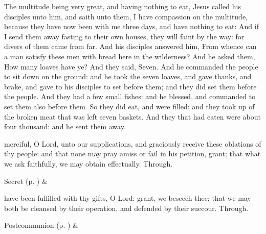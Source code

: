 \clearpage
{}
 The multitude being very great, and having nothing to eat, Jesus called his disciples unto him, and saith unto them, I have compassion on the multitude, because they have now been with me three days, and have nothing to eat: And if I send them away fasting to their own houses, they will faint by the way: for divers of them came from far. And his disciples answered him, From whence can a man satisfy these men with bread here in the wilderness? And he asked them, How many loaves have ye? And they said, Seven. And he commanded the people to sit down on the ground: and he took the seven loaves, and gave thanks, and brake, and gave to his disciples to set before them; and they did set them before the people. And they had a few small fishes: and he blessed, and commanded to set them also before them. So they did eat, and were filled: and they took up of the broken meat that was left seven baskets. And they that had eaten were about four thousand: and he sent them away.


\secret
{} merciful, O Lord, unto our supplications, and graciously receive these oblations of thy people: and that none may pray amiss or fail in his petition, grant; that what we ask faithfully, we may obtain effectually. Through.
\begin{rubric}
     Secret  (p. \pageref{SPSaints}) \&  
\end{rubric}


\postcommunion
{} have been fulfilled with thy gifts, O Lord: grant, we beseech thee; that we may both be cleansed by their operation, and defended by their succour. Through.
\begin{rubric}
     Postcommunion  (p. \pageref{SPSaints}) \&  
\end{rubric}


\clearpage
{}

